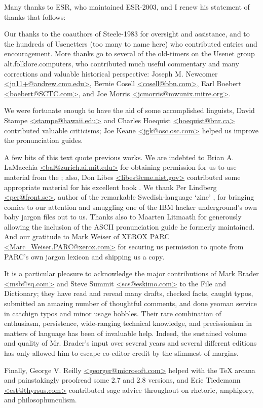 Many thanks to ESR, who maintained ESR-2003, and I renew his statement of thanks that follows:

Our thanks to the coauthors of Steele-1983 for oversight and assistance, and to the hundreds of Usenetters (too many to name here) who
contributed entries and encouragement. More thanks go to several of the old-timers on the Usenet group alt.folklore.computers, who
contributed much useful commentary and many corrections and valuable historical perspective: Joseph M. Newcomer
\url{<jn11+@andrew.cmu.edu>}, Bernie Cosell \url{<cosell@bbn.com>}, Earl Boebert \url{<boebert@SCTC.com>}, and Joe Morris
\url{<jcmorris@mwunix.mitre.org>}.

We were fortunate enough to have the aid of some accomplished linguists, David Stampe \url{<stampe@hawaii.edu>} and Charles Hoequist
\url{<hoequist@bnr.ca>} contributed valuable criticisms; Joe Keane \url{<jgk@osc.osc.com>} helped us improve the pronunciation guides.

A few bits of this text quote previous works. We are indebted to Brian A. LaMacchia \url{<bal@zurich.ai.mit.edu>} for obtaining
permission for us to use material from the ; also, Don Libes \url{<libes@cme.nist.gov>} contributed some
appropriate material for his excellent book . We thank Per Lindberg \url{<per@front.se>}, author of the
remarkable Swedish-language `zine' , for bringing  comics to our attention and smuggling one of the
IBM hacker underground's own baby jargon files out to us. Thanks also to Maarten Litmaath for generously allowing the inclusion of the
ASCII pronunciation guide he formerly maintained. And our gratitude to Mark Weiser of XEROX PARC \url{<Marc_Weiser.PARC@xerox.com>} for
securing us permission to quote from PARC's own jargon lexicon and shipping us a copy.

It is a particular pleasure to acknowledge the major contributions of Mark Brader \url{<msb@sq.com>} and Steve Summit
\url{<scs@eskimo.com>} to the File and Dictionary; they have read and reread many drafts, checked facts, caught typos, submitted an
amazing number of thoughtful comments, and done yeoman service in catchign typos and minor usage bobbles. Their rare combination of
enthusiasm, persistence, wide-ranging technical knowledge, and precissionism in matters of language has been of invaluable help. Indeed,
the sustained volume and quality of Mr. Brader's input over several years and several different editions has only allowed him to escape
co-editor credit by the slimmest of margins.

Finally, George V. Reilly \url{<georger@microsoft.com>} helped with the TeX arcana and painstakingly proofread some 2.7 and 2.8 versions,
and Eric Tiedemann \url{<est@thyrsus.com>} contributed sage advice throughout on rhetoric, amphigory, and philosophunculism.

